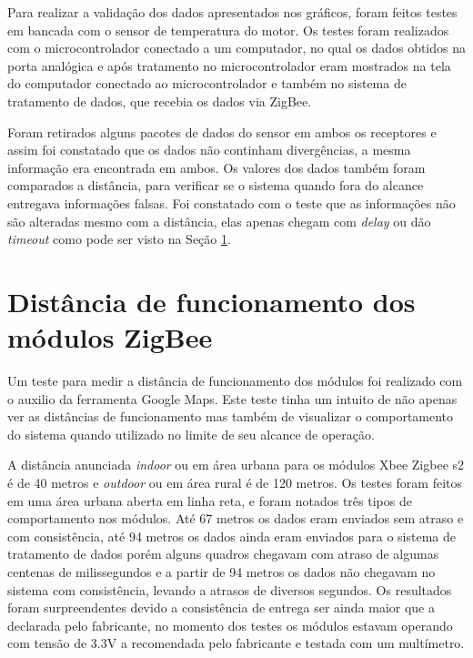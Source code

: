 Para realizar a validação dos dados apresentados nos gráficos, foram feitos testes em bancada com o sensor de temperatura do motor. Os testes foram realizados com o microcontrolador conectado a um computador, no qual os dados obtidos na porta analógica e após tratamento no microcontrolador eram mostrados na tela do computador conectado ao microcontrolador e também no sistema de tratamento de dados, que recebia os dados via ZigBee. 

Foram retirados alguns pacotes de dados do sensor em ambos os receptores e assim foi constatado que os dados não continham divergências, a mesma informação era encontrada em ambos. Os valores dos dados também foram comparados a distância, para verificar se o sistema quando fora do alcance entregava informações falsas. Foi constatado com o teste que as informações não são alteradas mesmo com a distância, elas apenas chegam com \textit{delay} ou dão \textit{timeout} como pode ser visto na Seção \ref{sec:distancia}.

\section{Distância de funcionamento dos módulos ZigBee}
\label{sec:distancia}

Um teste para medir a distância de funcionamento dos módulos foi realizado com o auxilio da ferramenta Google Maps. Este teste tinha um intuito de não apenas ver as distâncias de funcionamento mas também de visualizar o comportamento do sistema quando utilizado no limite de seu alcance de operação. 

A distância anunciada \cite{xbeeuserguide} \textit{indoor} ou em área urbana para os módulos Xbee Zigbee s2 é de 40 metros e \textit{outdoor} ou em área rural é de 120 metros. Os testes foram feitos em uma área urbana aberta em linha reta, e foram notados três tipos de comportamento nos módulos. Até 67 metros os dados eram enviados sem atraso e com consistência, até 94 metros os dados ainda eram enviados para o sistema de tratamento de dados porém alguns quadros chegavam com atraso de algumas centenas de milissegundos e a partir de 94 metros os dados não chegavam no sistema com consistência, levando a atrasos de diversos segundos. Os resultados foram surpreendentes devido a consistência de entrega ser ainda maior que a declarada pelo fabricante, no momento dos testes os módulos estavam operando com tensão de 3.3V a recomendada pelo fabricante e testada com um multímetro. 
